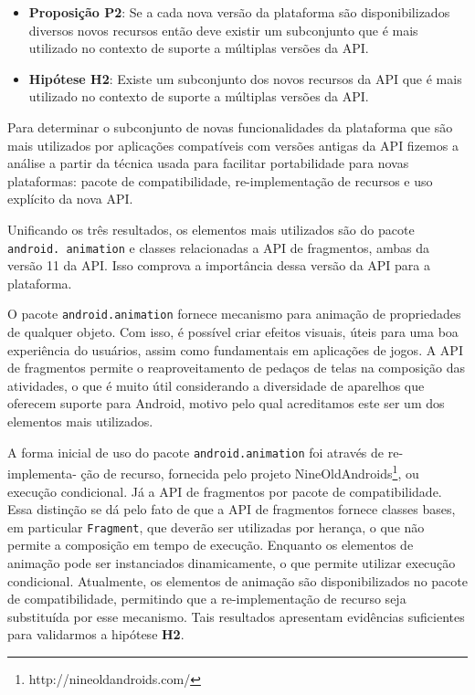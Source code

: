 \begin{itemize}
	\item \textbf{Proposição P2}: Se a cada nova versão da plataforma são disponibilizados
	diversos novos recursos então deve existir um subconjunto que é mais utilizado no 
	contexto de suporte a múltiplas versões da API.
	\item \textbf{Hipótese H2}: Existe um subconjunto dos novos recursos da API que é
	mais utilizado no contexto de suporte a múltiplas versões da API.
\end{itemize}

Para determinar o subconjunto de novas funcionalidades da plataforma que são mais
utilizados por aplicações compatíveis com versões antigas da API fizemos a análise
a partir da técnica usada para facilitar portabilidade para novas plataformas: pacote
de compatibilidade, re-implementação de recursos e uso explícito da nova API.

Unificando os três resultados,  os elementos mais utilizados são do pacote
\texttt{android. animation} e classes relacionadas a API de fragmentos, ambas
da versão 11 da API. Isso comprova a importância dessa versão da API para a
plataforma. 

O pacote \texttt{android.animation} fornece mecanismo para animação de propriedades
de qualquer objeto. Com isso, é possível criar efeitos visuais, úteis para uma boa
experiência do usuários, assim como fundamentais em aplicações de jogos. A API de
fragmentos permite o reaproveitamento de pedaços de telas na composição das atividades,
o que é muito útil considerando a diversidade de aparelhos que oferecem suporte para
Android, motivo pelo qual acreditamos este ser um dos elementos mais utilizados. 

A forma inicial de uso do pacote \texttt{android.animation} foi através de
re-implementa- ção de recurso, fornecida pelo projeto NineOldAndroids\footnote{http://nineoldandroids.com/},
ou execução condicional. Já a API de fragmentos por pacote de compatibilidade.
Essa distinção se dá pelo fato de que a API de fragmentos fornece classes bases,
em particular \texttt{Fragment}, que deverão ser utilizadas por herança, o que não
permite a composição em tempo de execução. Enquanto os elementos de animação pode
ser instanciados dinamicamente, o que permite utilizar execução condicional.
Atualmente, os elementos de animação são disponibilizados no pacote de compatibilidade,
permitindo que a re-implementação de recurso seja substituída por esse mecanismo.
Tais resultados apresentam evidências suficientes para validarmos a hipótese \textbf{H2}.

